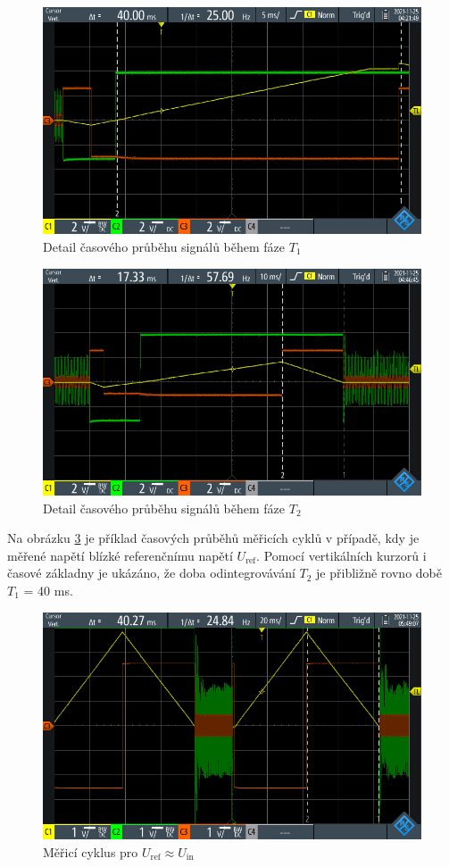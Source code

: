 \documentclass[twoside]{article}
\begin{document}
\begin{figure}[htbp]
    \centering
    \includegraphics[width=\linewidth]{t1.png}
    \caption{Detail časového průběhu signálů během fáze $T_1$}
    \label{fig:t1}
\end{figure}

\begin{figure}[htbp]
    \centering
    \includegraphics[width=\linewidth]{t2.png}
    \caption{Detail časového průběhu signálů během fáze $T_2$}
    \label{fig:t2}
\end{figure}

Na obrázku \ref{fig:uin_uref} je příklad časových průběhů měřicích cyklů v případě, kdy je měřené napětí blízké referenčnímu napětí $U_{\text{ref}}$.
Pomocí vertikálních kurzorů i časové základny je ukázáno, že doba odintegrovávání $T_2$ je přibližně rovno době $T_1$ = 40 ms.

\begin{figure}[htbp]
    \centering
    \includegraphics[width=\linewidth]{Uin_cca_Uref.png}
    \caption{Měřicí cyklus pro $U_{\text{ref}} \approx U_{\text{in}}$}
    \label{fig:uin_uref}
\end{figure}
\end{document}
